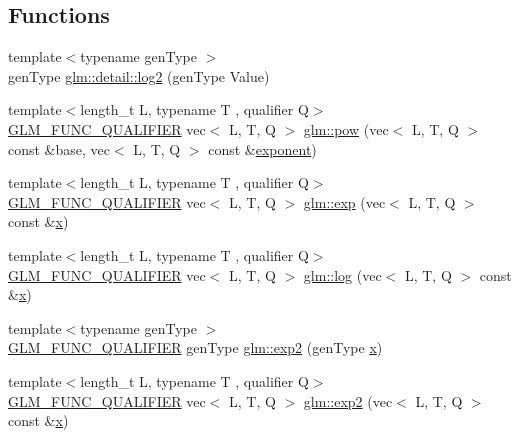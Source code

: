 \subsection*{Functions}
\begin{DoxyCompactItemize}
\item 
{\footnotesize template$<$typename gen\+Type $>$ }\\gen\+Type \hyperlink{namespaceglm_1_1detail_a3d24a612f2c5fa4f3aaf97dcd979ef1c}{glm\+::detail\+::log2} (gen\+Type Value)
\item 
{\footnotesize template$<$length\+\_\+t L, typename T , qualifier Q$>$ }\\\hyperlink{setup_8hpp_a33fdea6f91c5f834105f7415e2a64407}{G\+L\+M\+\_\+\+F\+U\+N\+C\+\_\+\+Q\+U\+A\+L\+I\+F\+I\+ER} vec$<$ L, T, Q $>$ \hyperlink{group__core__func__exponential_ga2254981952d4f333b900a6bf5167a6c4}{glm\+::pow} (vec$<$ L, T, Q $>$ const \&base, vec$<$ L, T, Q $>$ const \&\hyperlink{_s_d_l__opengl__glext_8h_a5088c45c98574ff28866140a93356e75}{exponent})
\item 
{\footnotesize template$<$length\+\_\+t L, typename T , qualifier Q$>$ }\\\hyperlink{setup_8hpp_a33fdea6f91c5f834105f7415e2a64407}{G\+L\+M\+\_\+\+F\+U\+N\+C\+\_\+\+Q\+U\+A\+L\+I\+F\+I\+ER} vec$<$ L, T, Q $>$ \hyperlink{group__core__func__exponential_ga071566cadc7505455e611f2a0353f4d4}{glm\+::exp} (vec$<$ L, T, Q $>$ const \&\hyperlink{_s_d_l__opengl_8h_ad0e63d0edcdbd3d79554076bf309fd47}{x})
\item 
{\footnotesize template$<$length\+\_\+t L, typename T , qualifier Q$>$ }\\\hyperlink{setup_8hpp_a33fdea6f91c5f834105f7415e2a64407}{G\+L\+M\+\_\+\+F\+U\+N\+C\+\_\+\+Q\+U\+A\+L\+I\+F\+I\+ER} vec$<$ L, T, Q $>$ \hyperlink{group__core__func__exponential_ga918c9f3fd086ce20e6760c903bd30fa9}{glm\+::log} (vec$<$ L, T, Q $>$ const \&\hyperlink{_s_d_l__opengl_8h_ad0e63d0edcdbd3d79554076bf309fd47}{x})
\item 
{\footnotesize template$<$typename gen\+Type $>$ }\\\hyperlink{setup_8hpp_a33fdea6f91c5f834105f7415e2a64407}{G\+L\+M\+\_\+\+F\+U\+N\+C\+\_\+\+Q\+U\+A\+L\+I\+F\+I\+ER} gen\+Type \hyperlink{namespaceglm_a8f6240c6756f850537398b1af2751c4b}{glm\+::exp2} (gen\+Type \hyperlink{_s_d_l__opengl_8h_ad0e63d0edcdbd3d79554076bf309fd47}{x})
\item 
{\footnotesize template$<$length\+\_\+t L, typename T , qualifier Q$>$ }\\\hyperlink{setup_8hpp_a33fdea6f91c5f834105f7415e2a64407}{G\+L\+M\+\_\+\+F\+U\+N\+C\+\_\+\+Q\+U\+A\+L\+I\+F\+I\+ER} vec$<$ L, T, Q $>$ \hyperlink{group__core__func__exponential_gaff17ace6b579a03bf223ed4d1ed2cd16}{glm\+::exp2} (vec$<$ L, T, Q $>$ const \&\hyperlink{_s_d_l__opengl_8h_ad0e63d0edcdbd3d79554076bf309fd47}{x})

\end{DoxyCompactItemize}

